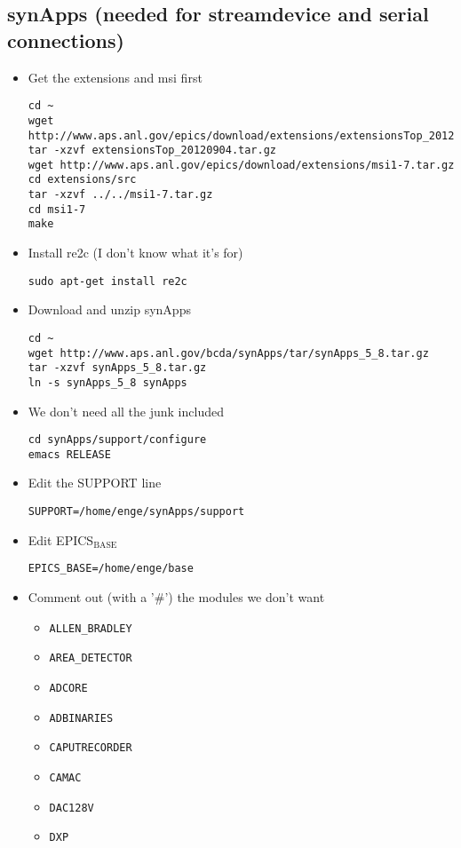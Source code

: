 \documentclass[11pt]{article}
\begin{document}
\subsection{synApps (needed for streamdevice and serial connections)}
\label{sec-1-2}
\begin{itemize}
\item Get the extensions and msi first
\begin{verbatim}
cd ~
wget http://www.aps.anl.gov/epics/download/extensions/extensionsTop_20120904.tar.gz
tar -xzvf extensionsTop_20120904.tar.gz
wget http://www.aps.anl.gov/epics/download/extensions/msi1-7.tar.gz
cd extensions/src
tar -xzvf ../../msi1-7.tar.gz
cd msi1-7
make
\end{verbatim}
\item Install re2c (I don't know what it's for)
\begin{verbatim}
sudo apt-get install re2c
\end{verbatim}
\item Download and unzip synApps
\begin{verbatim}
cd ~
wget http://www.aps.anl.gov/bcda/synApps/tar/synApps_5_8.tar.gz
tar -xzvf synApps_5_8.tar.gz
ln -s synApps_5_8 synApps
\end{verbatim}
\item We don't need all the junk included
\begin{verbatim}
cd synApps/support/configure
emacs RELEASE
\end{verbatim}
\item Edit the SUPPORT line
\begin{verbatim}
SUPPORT=/home/enge/synApps/support
\end{verbatim}
\item Edit EPICS$_{\text{BASE}}$
\begin{verbatim}
EPICS_BASE=/home/enge/base
\end{verbatim}
\item Comment out (with a '\#') the modules we don't want
\begin{itemize}
\item \verb~ALLEN_BRADLEY~
\item \verb~AREA_DETECTOR~
\item \verb~ADCORE~
\item \verb~ADBINARIES~
\item \verb~CAPUTRECORDER~
\item \verb~CAMAC~
\item \verb~DAC128V~
\item \verb~DXP~

\end{itemize}
\end{itemize}
\end{document}
